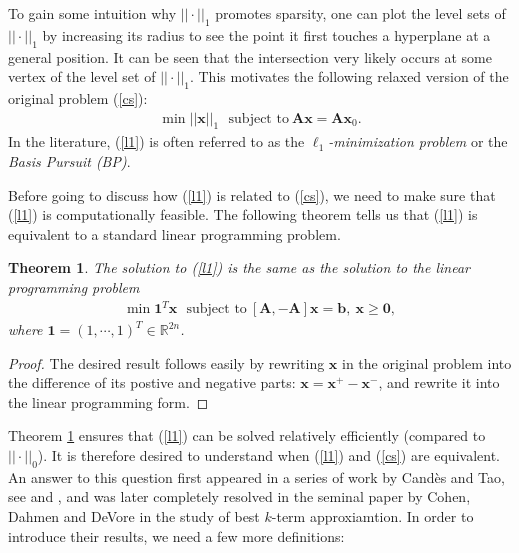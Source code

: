 \documentclass[11pt]{article}
\numberwithin{equation}{section}
\theoremstyle{plain}
\newtheorem{Th}{Theorem}[section]
\theoremstyle{definition}
\def\R{{\mathbb R}}
\def\R{{\mathbb R}}
\def\A{{\mathbf A}}
\def\x{{\mathbf x}}
\def\b{{\mathbf b}}
\begin{document}
To gain some intuition why $|| \cdot||_1$ promotes sparsity, one can plot the level sets of $|| \cdot||_1$ by increasing its radius to see the point it first touches a hyperplane at a general position. It can be seen that the intersection very likely occurs at some vertex of the level set of $|| \cdot||_1$. This motivates the following relaxed version of the original problem (\ref{cs}): 
\begin{align}
\min ||\x||_1 \ \ \ \text{subject to}\ \A\x=\A\x_0.\label{l1}
\end{align}
In the literature, (\ref{l1}) is often referred to as the \emph{$\ell_1$-minimization problem} or the \emph{Basis Pursuit (BP)}. 

Before going to discuss how (\ref{l1}) is related to (\ref{cs}), we need to make sure that (\ref{l1}) is computationally feasible. The following theorem tells us that (\ref{l1}) is equivalent to a standard linear programming problem. 

\begin{Th}\label{Linear programming}
The solution to (\ref{l1}) is the same as the solution to the linear programming problem
\begin{align}
\min \mathbf{1}^T\x \ \ \ \text{subject to}\ [\A, -\A]\x=\b, \ \x\geq \mathbf{0},\label{l1-LP}
\end{align}
where $\mathbf{1}=(1, \cdots, 1)^T\in\R^{2n}$. 
\end{Th}
\begin{proof}
The desired result follows easily by rewriting $\x$ in the original problem into the difference of its postive and negative parts: $\x=\x^+-\x^-$, and rewrite it into the linear programming form.   
\end{proof}

Theorem \ref{Linear programming} ensures that (\ref{l1}) can be solved relatively efficiently (compared to $|| \cdot||_0$). It is therefore desired to understand when (\ref{l1}) and (\ref{cs}) are equivalent. An answer to this question first appeared in a series of work by Cand\`es and Tao, see \cite{emmanuel2004robust} and \cite{candes2004near}, and was later completely resolved in the seminal paper \cite{cohen2009compressed} by Cohen, Dahmen and DeVore in the study of best $k$-term approxiamtion. In order to introduce their results, we need a few more definitions:
\end{document}
